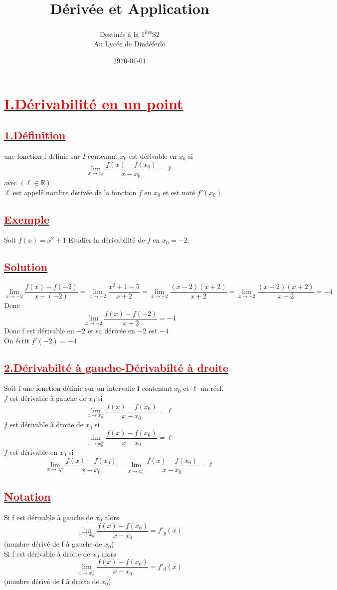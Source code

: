 \documentclass[12pt]{article}
\author{Destinés à la 1\textsuperscript{ère}S2\\Au Lycée de Dindéferlo}
\title{\textbf{Dérivée et Application}}
\date{\today}
\begin{document}
\maketitle
\newpage
\section*{\underline{\textbf{\textcolor{red}{I.Dérivabilité en un point}}}}
\subsection*{\underline{\textbf{\textcolor{red}{1.Définition}}}}
une fonction f définie sur $I$ contenant $x_{0}$ est dérivable en $x_{0}$ si\\ 
\[\lim_{x \to x_{0}}\frac{f(x)-f(x_{0})}{x-x_{0}}=\ell \] avec $(\ell \in\mathbb{R})$\\
$\ell$ est appelé nombre dérivée de la fonction $f$ en $x_{0}$ et est noté $f'(x_{0})$
\subsection*{\underline{\textbf{\textcolor{red}{Exemple}}}}
Soit $f(x)=x^{2}+1$  Etudier la dérivabilité de $f$ en $x_{0}=-2.$\\
\subsection*{\underline{\textbf{\textcolor{red}{Solution}}}}
\[\lim_{x \to -2}\frac{f(x)-f(-2)}{x-(-2)}=\lim_{x \to -2}\frac{x^{2}+1-5}{x+2}=
\lim_{x \to -2}\frac{(x-2)(x+2)}{x+2}=\lim_{x \to -2}\frac{(x-2)(x+2)}{x+2}=-4\]
Donc\[\lim_{x \to -2}\frac{f(x)-f(-2)}{x+2}=-4\]
Donc f est dérivable en $-2$ et sa dérivée en $-2$ est $-4$\\ On écrit $f'(-2)=-4$ 
\subsection*{\underline{\textbf{\textcolor{red}{2.Dérivabilté à gauche-Dérivabilté à droite}}}}
Soit f une fonction définie sur un intervalle I contenant $x_{0}$ et $\ell$ un réel.\\
$f$ est dérivable à gauche de $x_{0}$ si\[\lim_{x \to x_{0}^{-}}\frac{f(x)-f(x_{0})}{x-x_{0}}=\ell\]
$f$ est dérivable à droite de $x_{0}$ si\[\lim_{x \to x_{0}^{+}}\frac{f(x)-f(x_{0})}{x-x_{0}}=\ell\]
$f$ est dérivable en $x_{0}$ si\[\lim_{x \to x_{0}^{-}}\frac{f(x)-f(x_{0})}{x-x_{0}}=\lim_{x \to x_{0}^{+}}\frac{f(x)-f(x_{0})}{x-x_{0}}=\ell\]
\subsection*{\underline{\textbf{\textcolor{red}{Notation}}}}
Si f est dérivable à gauche de $x_{0}$  alors\[\lim_{x \to x_{0}^{-}}\frac{f(x)-f(x_{0})}{x-x_{0}}=f'_{g}(x)\](nombre dérivé de f à gauche de $x_{0}$)\\
Si f est dérivable à droite de $x_{0}$  alors\[\lim_{x \to x_{0}^{+}}\frac{f(x)-f(x_{0})}{x-x_{0}}=f'_{d}(x)\](nombre dérivé de f à droite de $x_{0}$)
\end{document}
